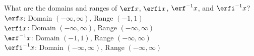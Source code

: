 {What are the domains and ranges of $\erf x$, $\erfi x$, $\erf^{-1} x$, and $\erfi^{-1} x$?
}
{$\erf x$: Domain $(-\infty,\infty)$, Range $(-1,1)$\\
$\erfi x$: Domain $(-\infty,\infty)$, Range $(-\infty,\infty)$\\
$\erf^{-1} x$: Domain $(-1,1)$, Range $(-\infty,\infty)$\\
$\erfi^{-1} x$: Domain $(-\infty,\infty)$, Range $(-\infty,\infty)$\\
}
